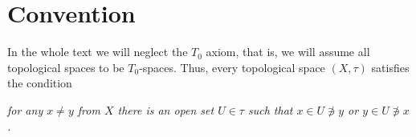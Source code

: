 \section*{Convention}

In the whole text we will neglect the $T_0$ axiom, that is, we will assume all
topological spaces to be $T_0$-spaces.
Thus, every topological space $(X, \tau)$ satisfies the condition
\begin{center} \it
  for any $x \ne y$ from $X$ there is an open set $U \in \tau$ such that $x \in U
  \not\owns y$ or $y \in U \not\owns x$.
\end{center}
